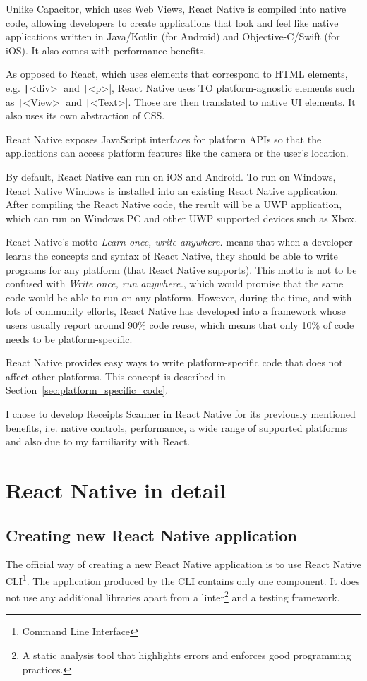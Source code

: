 \documentclass[
  digital, %
  table,   %
  oneside, %
  lof,     %
  lot,     %
]{fithesis3}
\newcommand{\code}[1]{\texttt|#1|} %
\begin{document}
Unlike Capacitor, which uses Web Views, React Native is compiled into native code, allowing developers to create applications that look and feel like native applications written in Java/Kotlin (for Android) and Objective-C/Swift (for iOS). It also comes with performance benefits. 

As opposed to React, which uses elements that correspond to HTML elements, e.g. \code{<div>} and \code{<p>}, React Native uses TO platform-agnostic elements such as \code{<View>} and \code{<Text>}. Those are then translated to native UI elements. It also uses its own abstraction of CSS.

React Native exposes JavaScript interfaces for platform APIs so that the applications can access platform features like the camera or the user’s location.

By default, React Native can run on iOS and Android. To run on Windows, React Native Windows is installed into an existing React Native application. After compiling the React Native code, the result will be a UWP application, which can run on Windows PC and other UWP supported devices such as Xbox.

React Native's motto \textit{Learn once, write anywhere.} means that when a developer learns the concepts and syntax of React Native, they should be able to write programs for any platform (that React Native supports). This motto is not to be confused with \textit{Write once, run anywhere.}, which would promise that the same code would be able to run on any platform. However, during the time, and with lots of community efforts, React Native has developed into a framework whose users usually report around 90\% code reuse, which means that only 10\% of code needs to be platform-specific. 

React Native provides easy ways to write platform-specific code that does not affect other platforms. This concept is described in Section~\ref{sec:platform_specific_code}.

I chose to develop Receipts Scanner in React Native for its previously mentioned benefits, i.e. native controls, performance, a wide range of supported platforms and also due to my familiarity with React.

\chapter{React Native in detail}

\section{Creating new React Native application}
The official way of creating a new React Native application is to use React Native CLI\footnote{Command Line Interface}. The application produced by the CLI contains only one component. It does not use any additional libraries apart from a linter\footnote{A static analysis tool that highlights errors and enforces good programming practices.} and a testing framework.
\end{document}
